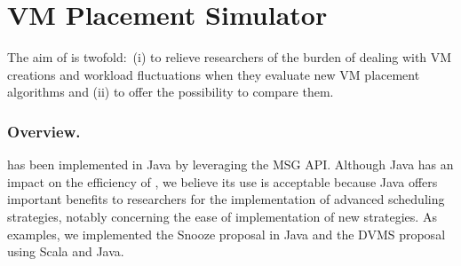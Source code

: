 \section{VM Placement Simulator}
\label{sec:injector}
\vspace*{-.17cm}

The aim of \vmps is twofold:~(i) to relieve researchers of the burden of
dealing with VM creations and workload fluctuations when they evaluate
new VM placement algorithms and (ii) to offer the possibility to
compare them.
%
%

\vspace*{-.25cm}
\subsubsection{Overview.}
\label{sec:overview}

\vmps has been implemented in Java by leveraging the \sg MSG API.
Although Java has an impact on the efficiency
of \sg, we believe its use is acceptable because Java offers important
benefits to researchers for the implementation of advanced scheduling
strategies, notably concerning the ease of implementation of new
strategies. As examples, we implemented the Snooze proposal in Java
and the DVMS proposal using Scala and Java.

